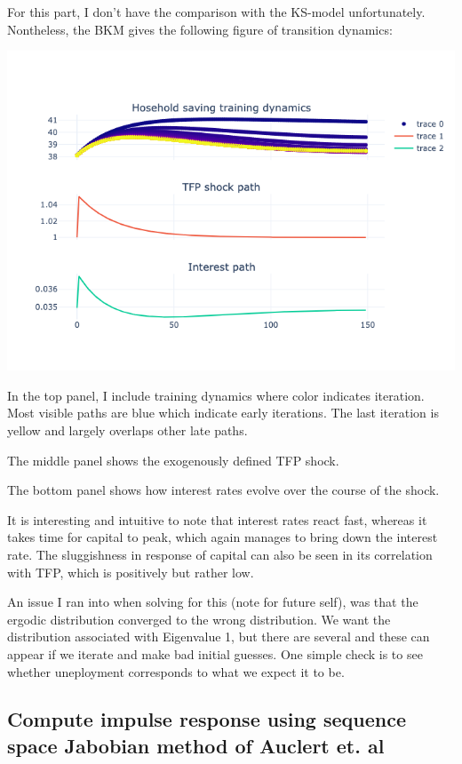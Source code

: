 For this part, I don't have the comparison with the KS-model unfortunately. Nontheless, the BKM gives the following figure of transition dynamics:

\includegraphics[scale = 0.8]{figures/training_dynamics.png}

In the top panel, I include training dynamics where color indicates iteration. Most visible paths are blue which indicate early iterations. The last iteration is yellow and largely overlaps other late paths.

The middle panel shows the exogenously defined TFP shock.

The bottom panel shows how interest rates evolve over the course of the shock.

It is interesting and intuitive to note that interest rates react fast, whereas it takes time for capital to peak, which again manages to bring down the interest rate. The sluggishness in response of capital can also be seen in its correlation with TFP, which is positively but rather low.

An issue I ran into when solving for this (note for future self), was that the ergodic distribution converged to the wrong distribution. We want the distribution associated with Eigenvalue 1, but there are several and these can appear if we iterate and make bad initial guesses. One simple check is to see whether uneployment corresponds to what we expect it to be.

\subsection{Compute impulse response using sequence space Jabobian method of Auclert et. al}

